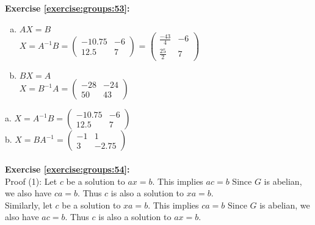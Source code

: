 \noindent\textbf{Exercise \ref{exercise:groups:53}:}
%
\begin{enumerate}[(a)]
\item
$AX=B$\\
$X=A^{-1}B=\begin{pmatrix}
-10.75 & -6\\
12.5 & 7
\end{pmatrix}$ = $\begin{pmatrix}
\frac{-43}{4} & -6\\
\frac{25}{2} & 7
\end{pmatrix}$\\


\item
$BX=A$\\
$X=B^{-1}A=\begin{pmatrix}
-28 & -24\\
50 & 43
\end{pmatrix}$\\
\end{enumerate}
a. $X=A^{-1}B=\begin{pmatrix}
-10.75 & -6\\
12.5 & 7
\end{pmatrix}$\\
b. $X=BA^{-1}=\begin{pmatrix}
-1 & 1\\
3 & -2.75
\end{pmatrix}$\\
\\

\noindent\textbf{Exercise \ref{exercise:groups:54}:}
\\
\noindent Proof (1):
Let $c$ be a solution to $ax=b$.  This implies $ac=b$ Since $G$ is abelian, we also have $ca=b$. Thus $c$ is also a solution to $xa=b$.\\
Similarly, let $c$ be a solution to $xa=b$.  This implies $ca=b$ Since $G$ is abelian, we also have $ac=b$. Thus $c$ is also a solution to $ax=b$.\\

